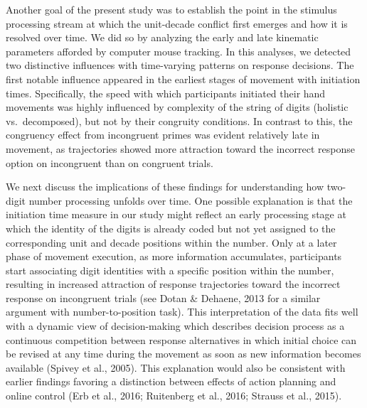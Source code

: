 \documentclass[english,man]{apa6}
\theoremstyle{definition}
\theoremstyle{definition}
\theoremstyle{definition}
\theoremstyle{remark}
\begin{document}
Another goal of the present study was to establish the point in the
stimulus processing stream at which the unit-decade conflict first
emerges and how it is resolved over time. We did so by analyzing the
early and late kinematic parameters afforded by computer mouse tracking.
In this analyses, we detected two distinctive influences with
time-varying patterns on response decisions. The first notable influence
appeared in the earliest stages of movement with initiation times.
Specifically, the speed with which participants initiated their hand
movements was highly influenced by complexity of the string of digits
(holistic vs.~decomposed), but not by their congruity conditions. In
contrast to this, the congruency effect from incongruent primes was
evident relatively late in movement, as trajectories showed more
attraction toward the incorrect response option on incongruent than on
congruent trials.

We next discuss the implications of these findings for understanding how
two-digit number processing unfolds over time. One possible explanation
is that the initiation time measure in our study might reflect an early
processing stage at which the identity of the digits is already coded
but not yet assigned to the corresponding unit and decade positions
within the number. Only at a later phase of movement execution, as more
information accumulates, participants start associating digit identities
with a specific position within the number, resulting in increased
attraction of response trajectories toward the incorrect response on
incongruent trials (see Dotan \& Dehaene, 2013 for a similar argument
with number-to-position task). This interpretation of the data fits well
with a dynamic view of decision-making which describes decision process
as a continuous competition between response alternatives in which
initial choice can be revised at any time during the movement as soon as
new information becomes available (Spivey et al., 2005). This
explanation would also be consistent with earlier findings favoring a
distinction between effects of action planning and online control (Erb
et al., 2016; Ruitenberg et al., 2016; Strauss et al., 2015).
\end{document}
